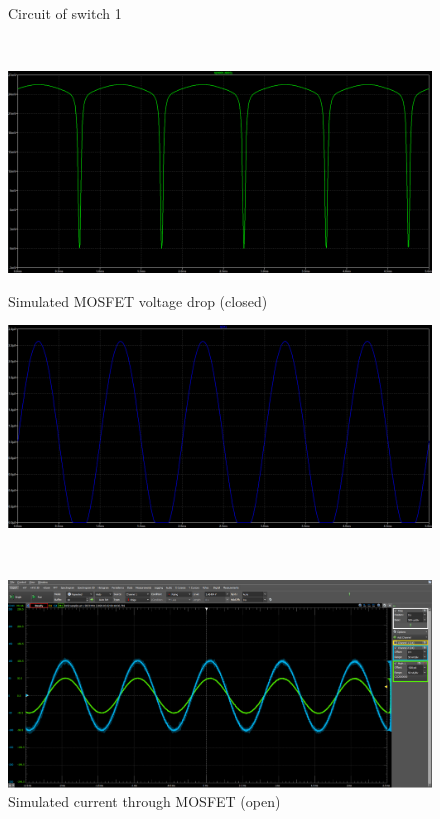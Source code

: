 \documentclass[12pt]{article}
\begin{document}
\begin{landscape}
\begin{figure}[ht!]
\begin{minipage}[b]{0.33\linewidth}
            \caption{Circuit of switch 1} 
            \vspace{4ex}
        \end{minipage}%
        ~
        \begin{minipage}[b]{0.33\linewidth}
            \centering
            \includegraphics[width=\linewidth]{images/S1ClosedSim.png} 
            \caption{Simulated MOSFET voltage drop (closed)} 
            \vspace{4ex}
        \end{minipage}
        \begin{minipage}[b]{0.33\linewidth}
            \centering
            \includegraphics[width=\linewidth]{images/S1OpenSim.png} 
            \caption{Simulated current through MOSFET (open)} 
            \vspace{4ex}
        \end{minipage}%
        ~
        \begin{minipage}[b]{0.33\linewidth}
            \centering
            \includegraphics[width=\linewidth]{images/S1Open.png} 

\end{minipage}
\end{figure}
\end{landscape}
\end{document}
